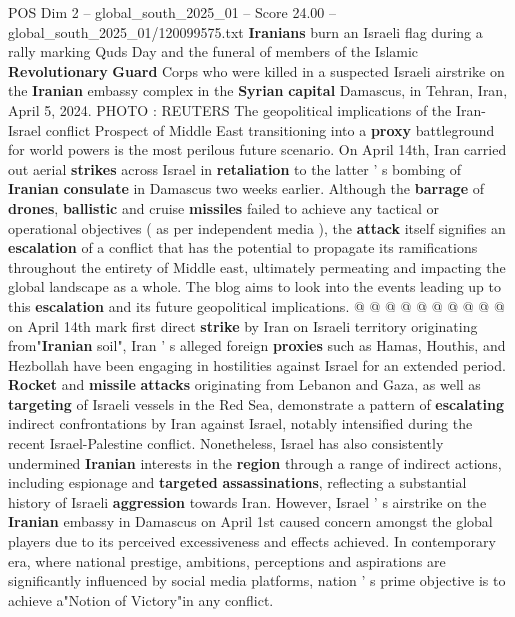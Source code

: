 \begin{textsample}{POS Dim 2 – global\_south\_2025\_01 – Score 24.00 – global\_south\_2025\_01/120099575.txt}  \label{ex:f2_pos_325}
\textbf{Iranians} burn an Israeli flag during a rally marking Quds Day and the funeral of members of the Islamic \textbf{Revolutionary} \textbf{Guard} Corps who were killed in a suspected Israeli airstrike on the \textbf{Iranian} embassy complex in the \textbf{Syrian} \textbf{capital} Damascus, in Tehran, Iran, April 5, 2024.
PHOTO : REUTERS The geopolitical implications of the Iran-Israel conflict Prospect of Middle East transitioning into a \textbf{proxy} battleground for world powers is the most perilous future scenario.
On April 14th, Iran carried out aerial \textbf{strikes} across Israel in \textbf{retaliation} to the latter ' s bombing of \textbf{Iranian} \textbf{consulate} in Damascus two weeks earlier.
Although the \textbf{barrage} of \textbf{drones}, \textbf{ballistic} and cruise \textbf{missiles} failed to achieve any tactical or operational objectives ( as per independent media ), the \textbf{attack} itself signifies an \textbf{escalation} of a conflict that has the potential to propagate its ramifications throughout the entirety of Middle east, ultimately permeating and impacting the global landscape as a whole.
The blog aims to look into the events leading up to this \textbf{escalation} and its future geopolitical implications. @ @ @ @ @ @ @ @ @ @ on April 14th mark first direct \textbf{strike} by Iran on Israeli territory originating from"\textbf{Iranian} soil", Iran ' s alleged foreign \textbf{proxies} such as Hamas, Houthis, and Hezbollah have been engaging in hostilities against Israel for an extended period. \textbf{Rocket} and \textbf{missile} \textbf{attacks} originating from Lebanon and Gaza, as well as \textbf{targeting} of Israeli vessels in the Red Sea, demonstrate a pattern of \textbf{escalating} indirect confrontations by Iran against Israel, notably intensified during the recent Israel-Palestine conflict.
Nonetheless, Israel has also consistently undermined \textbf{Iranian} interests in the \textbf{region} through a range of indirect actions, including espionage and \textbf{targeted} \textbf{assassinations}, reflecting a substantial history of Israeli \textbf{aggression} towards Iran.
However, Israel ' s airstrike on the \textbf{Iranian} embassy in Damascus on April 1st caused concern amongst the global players due to its perceived excessiveness and effects achieved.
In contemporary era, where national prestige, ambitions, perceptions and aspirations are significantly influenced by social media platforms, nation ' s prime objective is to achieve a"Notion of Victory"in any conflict.

\end{textsample}
